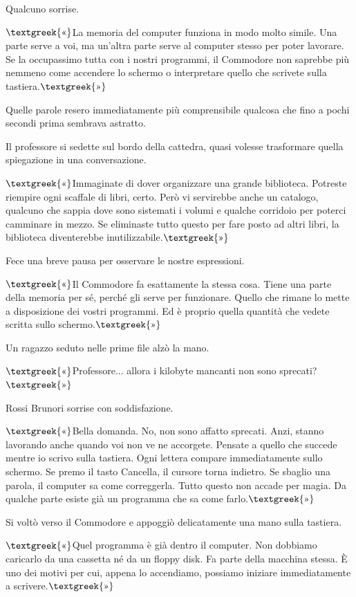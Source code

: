 \documentclass{article}
\begin{document}
Qualcuno sorrise.

$\text{\textgreek{«}}$La memoria del computer funziona in modo molto simile. Una parte serve a voi, ma un'altra parte
serve al computer stesso per poter lavorare. Se la occupassimo tutta con i nostri programmi, il Commodore non saprebbe
più nemmeno come accendere lo schermo o interpretare quello che scrivete sulla tastiera.$\text{\textgreek{»}}$

Quelle parole resero immediatamente più comprensibile qualcosa che fino a pochi secondi prima sembrava astratto.

Il professore si sedette sul bordo della cattedra, quasi volesse trasformare quella spiegazione in una conversazione.

$\text{\textgreek{«}}$Immaginate di dover organizzare una grande biblioteca. Potreste riempire ogni scaffale di libri,
certo. Però vi servirebbe anche un catalogo, qualcuno che sappia dove sono sistemati i volumi e qualche corridoio per
poterci camminare in mezzo. Se eliminaste tutto questo per fare posto ad altri libri, la biblioteca diventerebbe
inutilizzabile.$\text{\textgreek{»}}$

Fece una breve pausa per osservare le nostre espressioni.

$\text{\textgreek{«}}$Il Commodore fa esattamente la stessa cosa. Tiene una parte della memoria per sé, perché gli serve
per funzionare. Quello che rimane lo mette a disposizione dei vostri programmi. Ed è proprio quella quantità che vedete
scritta sullo schermo.$\text{\textgreek{»}}$

Un ragazzo seduto nelle prime file alzò la mano.

$\text{\textgreek{«}}$Professore... allora i kilobyte mancanti non sono sprecati?$\text{\textgreek{»}}$

Rossi Brunori sorrise con soddisfazione.

$\text{\textgreek{«}}$Bella domanda. No, non sono affatto sprecati. Anzi, stanno lavorando anche quando voi non ve ne
accorgete. Pensate a quello che succede mentre io scrivo sulla tastiera. Ogni lettera compare immediatamente sullo
schermo. Se premo il tasto Cancella, il cursore torna indietro. Se sbaglio una parola, il computer sa come correggerla.
Tutto questo non accade per magia. Da qualche parte esiste già un programma che sa come farlo.$\text{\textgreek{»}}$

Si voltò verso il Commodore e appoggiò delicatamente una mano sulla tastiera.

$\text{\textgreek{«}}$Quel programma è già dentro il computer. Non dobbiamo caricarlo da una cassetta né da un floppy
disk. Fa parte della macchina stessa. È uno dei motivi per cui, appena lo accendiamo, possiamo iniziare immediatamente
a scrivere.$\text{\textgreek{»}}$
\end{document}
